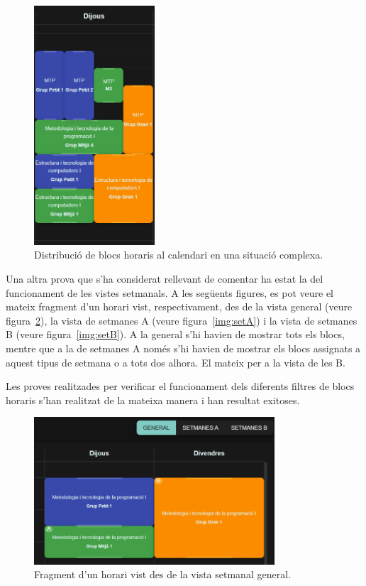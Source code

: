 \documentclass[a4paper,12pt]{ThesisStyle}
\begin{document}
\begin{figure}[H]
  \centering
  \includegraphics[width=0.4\textwidth]{assets/proves/layout.png}
  \caption{\label{img:proves_layout} Distribució de blocs horaris al calendari en una situació complexa.}
\end{figure}

Una altra prova que s'ha considerat rellevant de comentar ha estat la del funcionament de les vistes setmanals. A les següents figures, es pot veure el mateix fragment d'un horari vist, respectivament, des de la vista general (veure figura~\ref{img:setGeneral}), la vista de setmanes A (veure figura~\ref{img:setA}) i la vista de setmanes B (veure figura~\ref{img:setB}). A la general s'hi havien de mostrar tots els blocs, mentre que a la de setmanes A només s'hi havien de mostrar els blocs assignats a aquest tipus de setmana o a tots dos alhora. El mateix per a la vista de les B.

Les proves realitzades per verificar el funcionament dels diferents filtres de blocs horaris s'han realitzat de la mateixa manera i han resultat exitoses.

\begin{figure}[H]
  \centering
  \includegraphics[width=0.8\textwidth]{assets/proves/setGeneral.png}
  \caption{\label{img:setGeneral} Fragment d'un horari vist des de la vista setmanal general.}
\end{figure}
\end{document}

